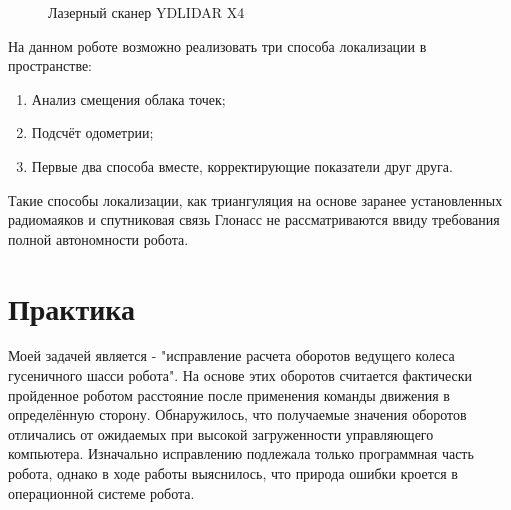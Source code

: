 \documentclass[12pt,a4paper]{scrartcl}
\begin{document}
			\begin{figure}[h]
				\caption{Лазерный сканер YDLIDAR X4}
				\label{fig:X4}
			\end{figure}
			
			На данном роботе возможно реализовать три способа локализации в пространстве:
			\begin{enumerate}
				\item Анализ смещения облака точек;
				\item Подсчёт одометрии;
				\item Первые два способа вместе, корректирующие показатели друг друга.
			\end{enumerate}
			
			Такие способы локализации, как триангуляция на основе заранее установленных радиомаяков и спутниковая связь Глонасс не рассматриваются ввиду требования полной автономности робота.
			
		\section*{Практика}
			Моей задачей является - "исправление расчета оборотов ведущего колеса гусеничного шасси робота". На основе этих оборотов считается фактически пройденное роботом расстояние после применения команды движения в определённую сторону. Обнаружилось, что получаемые значения оборотов отличались от ожидаемых при высокой загруженности управляющего компьютера. Изначально исправлению подлежала только программная часть робота, однако в ходе работы выяснилось, что природа ошибки кроется в операционной системе робота. 
			
\end{document}
